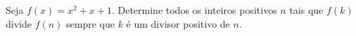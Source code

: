 Seja $f(x)=x^2+x+1$. Determine todos os inteiros positivos $n$ tais que $f(k)$ divide $f(n)$ sempre que $k$ é um divisor positivo de $n$.
